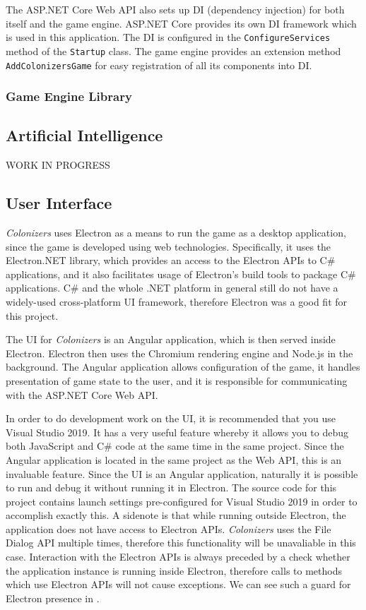 The ASP.NET Core Web API also sets up DI (dependency injection) for both itself and
the game engine. ASP.NET Core provides its own DI framework
which is used in this application. The DI is configured in the
\texttt{ConfigureServices} method of the \texttt{Startup} class.
The game engine provides an extension method \texttt{AddColonizersGame}
for easy registration of all its components into DI.

\subsubsection{Game Engine Library}



\subsection{Artificial Intelligence}
\label{chap:aidev}

WORK IN PROGRESS

\subsection{User Interface}

\emph{Colonizers} uses Electron as a means to run the game as a desktop application,
since the game is developed using web technologies. Specifically, it uses the
Electron.NET library, which provides an access to the Electron APIs to C\# applications,
and it also facilitates usage of Electron's build tools to package C\# applications.
C\# and the whole .NET platform in general still do not have a widely-used cross-platform
UI framework, therefore Electron was a good fit for this project.

The UI for \emph{Colonizers} is an Angular application, which is then served inside
Electron. Electron then uses the Chromium rendering engine and Node.js in the background.
The Angular application allows configuration of the game, it handles presentation
of game state to the user, and it is responsible for communicating with the
ASP.NET Core Web API.

In order to do development work on the UI, it is recommended that you use
Visual Studio 2019. It has a very useful feature whereby it allows you to debug
both JavaScript and C\# code at the same time in the same project. Since the Angular
application is located in the same project as the Web API, this is an invaluable
feature. Since the UI is an Angular application, naturally it is possible
to run and debug it without running it in Electron. The source code for this project
contains launch settings pre-configured for Visual Studio 2019 in order to accomplish
exactly this. A sidenote is that while running outside Electron, the application
does not have access to Electron APIs. \emph{Colonizers} uses the File Dialog
API multiple times, therefore this functionality will be unavaliable in this case.
Interaction with the Electron APIs is always preceded by a check whether
the application instance is running inside Electron, therefore calls
to methods which use Electron APIs will not cause exceptions. We can see
such a guard for Electron presence in .

